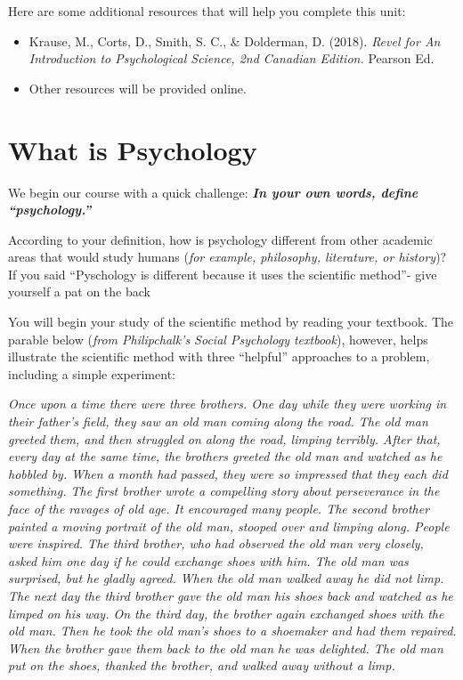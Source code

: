 \documentclass[
]{book}
\providecommand{\tightlist}{%
  \setlength{\itemsep}{0pt}\setlength{\parskip}{0pt}}
\begin{document}
Here are some additional resources that will help you complete this unit:

\begin{itemize}
\tightlist
\item
  Krause, M., Corts, D., Smith, S. C., \& Dolderman, D. (2018). \emph{Revel for An Introduction to Psychological Science, 2nd Canadian Edition.} Pearson Ed.\\
\item
  Other resources will be provided online.
\end{itemize}

\hypertarget{what-is-psychology}{%
\section{What is Psychology}\label{what-is-psychology}}

We begin our course with a quick challenge: \textbf{\emph{In your own words, define ``psychology.''}}

According to your definition, how is psychology different from other academic areas that would study humans (\emph{for example, philosophy, literature, or history})? If you said ``Pyschology is different because it uses the scientific method''- give yourself a pat on the back

You will begin your study of the scientific method by reading your textbook. The parable below (\emph{from Philipchalk's Social Psychology textbook}), however, helps illustrate the scientific method with three ``helpful'' approaches to a problem, including a simple experiment:

\emph{Once upon a time there were three brothers. One day while they were working in their father's field, they saw an old man coming along the road. The old man greeted them, and then struggled on along the road, limping terribly. After that, every day at the same time, the brothers greeted the old man and watched as he hobbled by. When a month had passed, they were so impressed that they each did something. The first brother wrote a compelling story about perseverance in the face of the ravages of old age. It encouraged many people. The second brother painted a moving portrait of the old man, stooped over and limping along. People were inspired. The third brother, who had observed the old man very closely, asked him one day if he could exchange shoes with him. The old man was surprised, but he gladly agreed. When the old man walked away he did not limp. The next day the third brother gave the old man his shoes back and watched as he limped on his way. On the third day, the brother again exchanged shoes with the old man. Then he took the old man's shoes to a shoemaker and had them repaired. When the brother gave them back to the old man he was delighted. The old man put on the shoes, thanked the brother, and walked away without a limp.}
\end{document}

